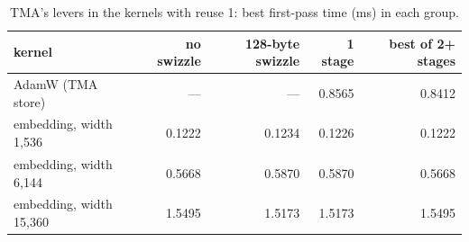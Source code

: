 \documentclass[10pt]{article}
\begin{document}
\begin{table}[h]
  \centering
  \caption{TMA's levers in the kernels with reuse 1: best first-pass time (ms) in each group.}
  \label{tab:levers-streaming}
  \small
  \begin{tabular}{@{}lrrrr@{}}
    \toprule
    kernel & no swizzle & 128-byte swizzle & 1 stage & best of 2+ stages \\
    \midrule
    AdamW (TMA store)          & --- & --- & 0.8565 & 0.8412 \\
    embedding, width 1{,}536   & 0.1222 & 0.1234 & 0.1226 & 0.1222 \\
    embedding, width 6{,}144   & 0.5668 & 0.5870 & 0.5870 & 0.5668 \\
    embedding, width 15{,}360  & 1.5495 & 1.5173 & 1.5173 & 1.5495 \\
    \bottomrule
  \end{tabular}
\end{table}
\end{document}
